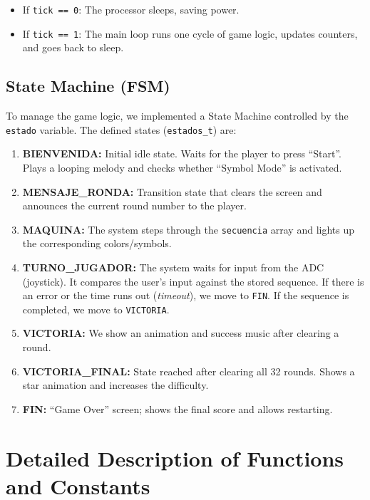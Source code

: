 \documentclass[11pt]{article}
\begin{document}
\begin{itemize}
    \item If \texttt{tick == 0}: The processor sleeps, saving power.
    \item If \texttt{tick == 1}: The main loop runs one cycle of game logic, updates counters, and goes back to sleep.
\end{itemize}

\subsection{State Machine (FSM)}

To manage the game logic, we implemented a State Machine controlled by the \texttt{estado} variable. The defined states (\texttt{estados\_t}) are:

\begin{enumerate}
    \item \textbf{BIENVENIDA:} Initial idle state. Waits for the player to press ``Start''. Plays a looping melody and checks whether ``Symbol Mode'' is activated.
    \item \textbf{MENSAJE\_RONDA:} Transition state that clears the screen and announces the current round number to the player.
    \item \textbf{MAQUINA:} The system steps through the \texttt{secuencia} array and lights up the corresponding colors/symbols.
    \item \textbf{TURNO\_JUGADOR:} The system waits for input from the ADC (joystick). It compares the user's input against the stored sequence. If there is an error or the time runs out (\textit{timeout}), we move to \texttt{FIN}. If the sequence is completed, we move to \texttt{VICTORIA}.
    \item \textbf{VICTORIA:} We show an animation and success music after clearing a round.
    \item \textbf{VICTORIA\_FINAL:} State reached after clearing all 32 rounds. Shows a star animation and increases the difficulty.
    \item \textbf{FIN:} ``Game Over'' screen; shows the final score and allows restarting.
\end{enumerate}

\section{Detailed Description of Functions and Constants}
\end{document}

